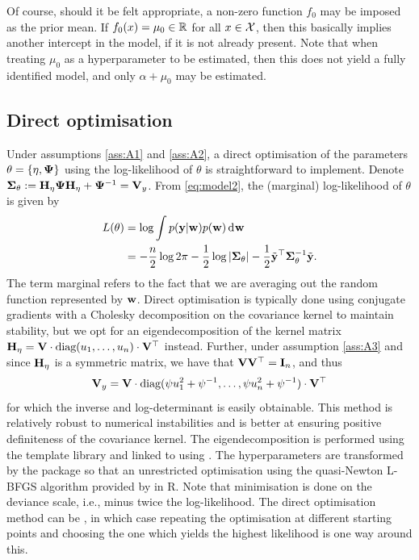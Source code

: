 Of course, should it be felt appropriate, a non-zero function $f_0$ may be imposed as the prior mean.
If $f_0(x) = \mu_0 \in \bbR$ for all $x\in\cX$, then this basically implies another intercept in the model, if it is not already present.
Note that when treating $\mu_0$ as a hyperparameter to be estimated, then this does not yield a fully identified model, and only $\alpha +\mu_0$ may be estimated.


\subsection{Direct optimisation}

Under assumptions \ref{ass:A1} and \ref{ass:A2}, a direct optimisation of the parameters $\theta=\{\eta,\bPsi \}$ using the log-likelihood of $\theta$ is straightforward to implement.
Denote $\bSigma_\theta := \bH_\eta\bPsi\bH_\eta + \bPsi^{-1} = \bV_y$.
From \eqref{eq:model2}, the (marginal) log-likelihood of $\theta$ is given by
%
\begin{align}
  L(\theta)
  &= \log \int p(\by|\bw)p(\bw) \dint \bw \nonumber \\
  &= -\half[n]\log 2\pi - \half\log\vert \bSigma_\theta \vert - \half \tilde\by^\top \bSigma_\theta^{-1} \tilde\by \label{eq:marglogliky}.
\end{align}
%
The term marginal refers to the fact that we are averaging out the random function represented by $\bw$.
Direct optimisation is typically done using conjugate gradients with a Cholesky decomposition on the covariance kernel to maintain stability, but we opt for an eigendecomposition of the kernel matrix $\bH_{\eta} = \bV\cdot\text{diag}(u_1,\dots,u_n)\cdot\bV^\top$ instead.
Further, under assumption \ref{ass:A3} and since $\bH_{\eta}$ is a symmetric matrix, we have that $\bV\bV^\top = \bI_n$, and thus
%
\[
  \bV_y = \bV \cdot \text{diag} (\psi u_1^2 + \psi^{-1},\dots,\psi u_n^2 + \psi^{-1}) \cdot \bV^\top
\]
%
for which the inverse and log-determinant is easily obtainable.
This method is relatively robust to numerical instabilities and is better at ensuring positive definiteness of the covariance kernel.
The eigendecomposition is performed using the   template library and linked to  using  \citep{eddelbuettel2011rcpp}.
The hyperparameters are transformed by the  package so that an unrestricted optimisation using the quasi-Newton L-BFGS algorithm provided by  in \proglang R.
Note that minimisation is done on the deviance scale, i.e., minus twice the log-likelihood.
The direct optimisation method can be , in which case repeating the optimisation at different starting points and choosing the one which yields the highest likelihood is one way around this.

